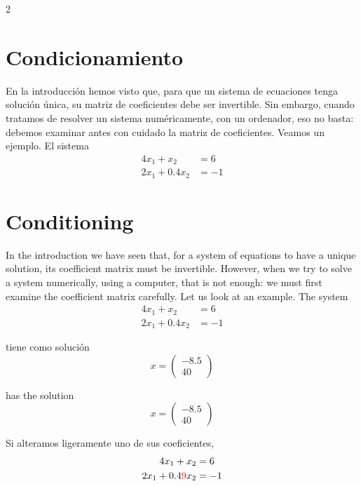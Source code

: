 \begin{paracol}{2}
\section{Condicionamiento}\label{sec:condicionamiento}
En la introducción hemos visto que, para que un sistema de ecuaciones tenga solución única, su matriz de coeficientes debe ser invertible. Sin embargo, cuando tratamos de resolver un sistema numéricamente, con un ordenador, eso no basta: debemos examinar antes con cuidado la matriz de coeficientes. Veamos un ejemplo. El sistema
\begin{align*}
4x_1+x_2&=6\\
2x_1+0.4 x_2&=-1
\end{align*}
\switchcolumn
\section{Conditioning}\label{sec:condicionamiento-2}
In the introduction we have seen that, for a system of equations to have a unique solution, its coefficient matrix must be invertible. However, when we try to solve a system numerically, using a computer, that is not enough: we must first examine the coefficient matrix carefully. Let us look at an example. The system
\begin{align*}
4x_1+x_2&=6\\
2x_1+0.4 x_2&=-1
\end{align*}

\switchcolumn

tiene como solución
\begin{equation*}
x=\begin{pmatrix}
-8.5\\
40
\end{pmatrix}
\end{equation*}

\switchcolumn
has the solution
\begin{equation*}
x=\begin{pmatrix}
-8.5\\
40
\end{pmatrix}
\end{equation*}

\switchcolumn

Si alteramos ligeramente uno de sus coeficientes,
\begin{align*}
4x_1+x_2&=6\\
2x_1+0.4{\color{red}9} x_2&=-1
\end{align*}


\end{paracol}
